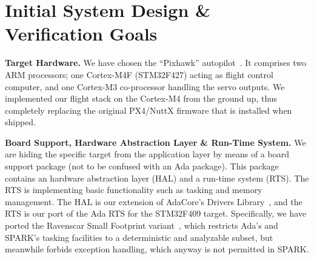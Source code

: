 \section{Initial System Design \& Verification Goals}
\label{sec:context}

\textbf{Target Hardware.} We have chosen the ``Pixhawk''
autopilot~\cite{pixhawk2011}. It comprises two ARM processors; one
Cortex-M4F (STM32F427) acting as flight control computer, and one
Cortex-M3 co-processor handling the servo outputs. We implemented our
flight stack on the Cortex-M4 from the ground up, thus completely
replacing the original PX4/NuttX firmware that is installed when
shipped. 


\textbf{Board Support, Hardware Abstraction Layer \& Run-Time System.}
We are hiding the specific target from the application
layer by means of a board support package (not to be confused with an Ada package). This package contains an
hardware abstraction layer (HAL) and a run-time system (RTS). The RTS
is implementing basic functionality such
as tasking and 
memory management. %
The HAL is our extension of AdaCore's Drivers
Library~\cite{AdaDriverLib}, and the RTS is our port of the Ada RTS for the
 STM32F409 target.  Specifically, we have ported the
Ravenscar Small Footprint variant~\cite{Ravenscar},   %
which restricts Ada's and SPARK's tasking facilities to a deterministic and
analyzable subset, but meanwhile forbids exception handling, which anyway is not permitted in SPARK.



